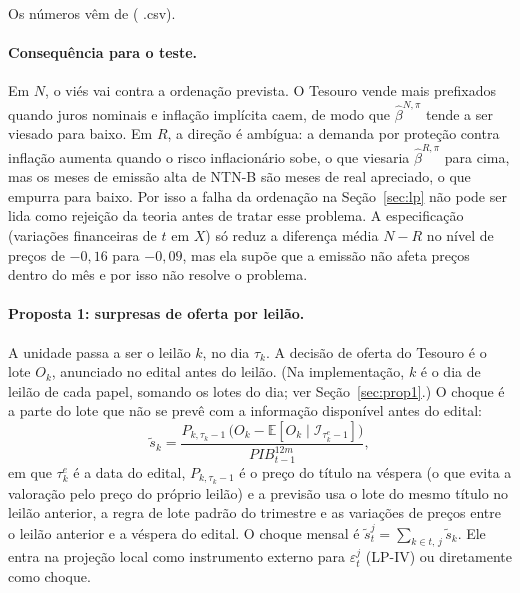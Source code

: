 \documentclass[12pt,a4paper]{article}
\begin{document}
Os números vêm de 
(
.csv).

\paragraph{Consequência para o teste.} Em \(N\), o viés vai contra a ordenação
prevista. O Tesouro vende mais prefixados quando juros nominais e inflação
implícita caem, de modo que \(\hat\beta^{N,\pi}\) tende a ser viesado para baixo. Em
\(R\), a direção é ambígua: a demanda por proteção contra inflação aumenta quando o
risco inflacionário sobe, o que viesaria \(\hat\beta^{R,\pi}\) para cima, mas os
meses de emissão alta de NTN-B são meses de real apreciado, o que empurra para
baixo. Por isso a falha da ordenação na Seção~\ref{sec:lp} não pode ser lida como
rejeição da teoria antes de tratar esse problema. A especificação 
(variações financeiras de \(t\) em \(X\)) só reduz a diferença média \(N-R\) no nível
de preços de \(-0{,}16\) para \(-0{,}09\), mas ela supõe que a emissão não afeta
preços dentro do mês e por isso não resolve o problema.

\paragraph{Proposta 1: surpresas de oferta por leilão.}
A unidade passa a ser o leilão \(k\), no dia \(\tau_k\). A decisão de oferta do
Tesouro é o lote \(O_k\), anunciado no edital antes do leilão. (Na implementação,
\(k\) é o dia de leilão de cada papel, somando os lotes do dia; ver
Seção~\ref{sec:prop1}.) O choque é a parte do
lote que não se prevê com a informação disponível antes do edital:
\[
\tilde s_k=\frac{P_{k,\tau_k-1}\,\bigl(O_k-\mathbb{E}[O_k\mid\mathcal{I}_{\tau_k^e-1}]\bigr)}{PIB^{12m}_{t-1}},
\]
em que \(\tau_k^e\) é a data do edital, \(P_{k,\tau_k-1}\) é o preço do título na
véspera (o que evita a valoração pelo preço do próprio leilão) e a previsão usa o
lote do mesmo título no leilão anterior, a regra de lote padrão do trimestre e as
variações de preços entre o leilão anterior e a véspera do edital. O choque mensal
é \(\tilde s_t^j=\sum_{k\in t,\,j}\tilde s_k\). Ele entra na projeção local como
instrumento externo para \(\varepsilon_t^j\) (LP-IV) ou diretamente como choque.
\end{document}
